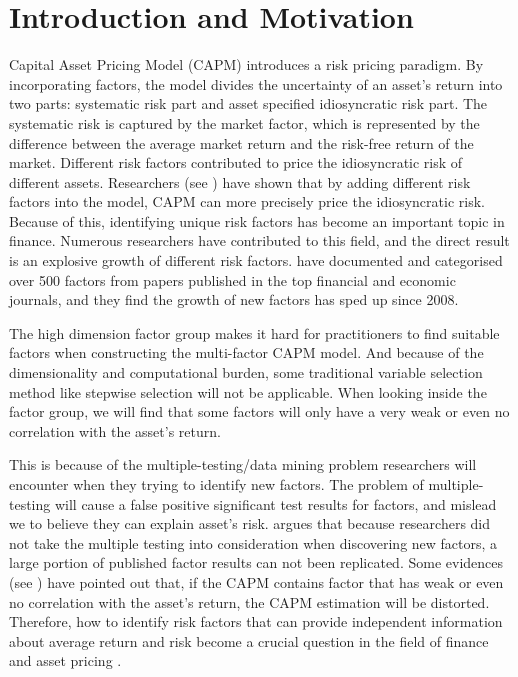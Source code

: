 \chapter{Introduction and Motivation}
Capital Asset Pricing Model (CAPM) \cite{Sharpe1964, Lintner1965, Black1972} introduces a risk pricing paradigm.
By incorporating factors, the model divides the uncertainty of an asset's return into two parts: systematic risk part and asset specified idiosyncratic risk part.
The systematic risk is captured by the market factor, which is represented by the difference between the average market return and the risk-free return of the market.
Different risk factors contributed to price the idiosyncratic risk of different assets.
Researchers (see ) have shown that by adding different risk factors into the model, CAPM can more precisely price the idiosyncratic risk.
Because of this, identifying unique risk factors has become an important topic in finance.
Numerous researchers have contributed to this field, and the direct result is an explosive growth of different risk factors.
  have documented and categorised over 500 factors from papers published in the top financial and economic journals, and they find the growth of new factors has sped up since 2008. 
 
The high dimension factor group makes it hard for practitioners to find suitable factors when constructing the multi-factor CAPM model.
And because of the dimensionality and computational burden, some traditional variable selection method like stepwise selection will not be applicable.
When looking inside the factor group, we will find that some factors will only have a very weak or even no correlation with the asset's return.

This is because of the multiple-testing/data mining problem researchers will encounter when they trying to identify new factors.
The problem of multiple-testing will cause a false positive significant test results for factors, and mislead we to believe they can explain asset's risk.
 argues that because researchers did not take the multiple testing into consideration when discovering new factors, a large portion of published factor results can not been replicated.
Some evidences (see ) have pointed out that, if the CAPM contains factor that has weak or even no correlation with the asset's return, the CAPM estimation will be distorted.
Therefore, how to identify risk factors that can provide independent information about average return and risk become a crucial question in the field of finance and asset pricing \cite{Cochrane2011}.

